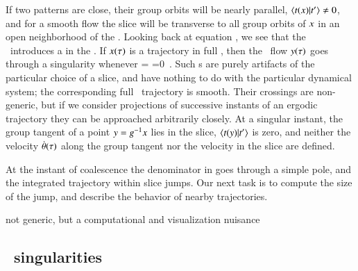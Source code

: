 

If  two patterns are close, their group orbits will be nearly parallel,
$\braket{\groupTan(\ssp)}{\sliceTan{}} \neq 0$, and for a smooth flow the
slice will be transverse to all group orbits of $x$ in an open
neighborhood of the {\template} \slicep.
Looking back at equation , we see that the \mslices\
introduces a {\sset} in the \reducedsp. If
$x(\tau)$ is a trajectory in full {\statesp}, then the \reducedsp\
flow $y(\tau)$ goes through a singularity whenever
\beq
\braket{\groupTan(\sspSing)}{\sliceTan{}}
 =
\braket{\sspSing}{\Lg^2\slicep}
 =0
\,.
Such {\sset s} are purely artifacts of the particular choice of a slice,
and have nothing to do with the particular dynamical system; the
corresponding full \statesp\ trajectory is smooth. Their crossings are
non-generic, but if we consider projections of successive instants of an
ergodic trajectory they can be approached arbitrarily closely. At a
singular instant, the group tangent of a point $y=g^{-1} x$
lies in the slice, $\braket{\groupTan(\sspRed)}{\sliceTan{}}$ is zero,
and neither the velocity $\dot{{\bf \theta}}(\tau)$ along the group tangent
nor the velocity in the slice are defined.

At the instant of
coalescence the denominator in  goes through a simple
pole, and the integrated trajectory within slice jumps. Our next task is
to compute the size of the jump, and describe the behavior of nearby
trajectories.

not generic, but a computational and visualization nuisance

\subsection{\Slice\ singularities}
\label{sec:sliceSing}



